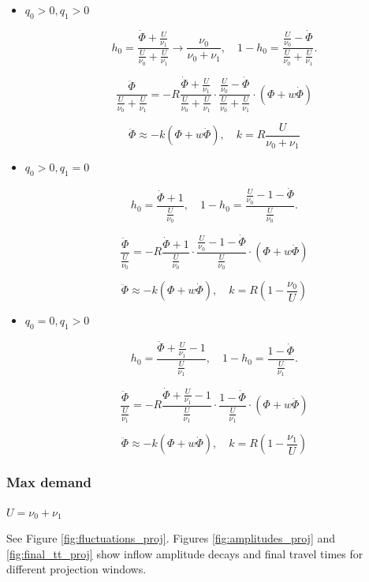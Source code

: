 \documentclass[12pt]{article}
\begin{document}
 \begin{itemize}
 
	\item $ q_0 > 0, q_1 > 0 $
		
	$$ h_0 = \frac{\dot{\Phi} + \frac{U}{\nu_1}}{\frac{U}{\nu_0} + \frac{U}{\nu_1}} \to \frac{\nu_0}{\nu_0 + \nu_1 },\quad 1 - h_0 = \frac{\frac{U}{\nu_0} - \dot{\Phi}}{{\frac{U}{\nu_0} + \frac{U}{\nu_1}}} . $$

$$ \frac{\ddot{\Phi}}{\frac{U}{\nu_0} + \frac{U}{\nu_1}} = -R \frac{\dot{\Phi} + \frac{U}{\nu_1}}{\frac{U}{\nu_0} + \frac{U}{\nu_1}} \cdot \frac{\frac{U}{\nu_0} - \dot{\Phi}}{\frac{U}{\nu_0} + \frac{U}{\nu_1}} \cdot (\Phi + w \dot{\Phi}) $$

$$ \ddot{\Phi} \approx - k (\Phi + w \dot{\Phi}), \quad k = R \frac{U}{\nu_0 + \nu_1} $$

 
	
	\item $ q_0 > 0, q_1 = 0 $ 
	
		$$ h_0 = \frac{\dot{\Phi} + 1}{\frac{U}{\nu_0}} ,\quad 1 - h_0 = \frac{\frac{U}{\nu_0} - 1 - \dot{\Phi}}{{\frac{U}{\nu_0} }} . $$

$$ \frac{\ddot{\Phi}}{\frac{U}{\nu_0} } = -R \frac{\dot{\Phi} + 1}{\frac{U}{\nu_0} } \cdot \frac{\frac{U}{\nu_0} - 1 - \dot{\Phi}}{{\frac{U}{\nu_0} }} \cdot (\Phi + w \dot{\Phi}) $$

$$ \ddot{\Phi} \approx - k (\Phi + w \dot{\Phi}), \quad k = R( 1 -\frac{\nu_0}{U}) $$

	\item $ q_0 = 0, q_1 > 0 $ 
	
		$$ h_0 = \frac{\dot{\Phi} + \frac{U}{\nu_1} - 1}{\frac{U}{\nu_1}} ,\quad 1 - h_0 = \frac{ 1 - \dot{\Phi}}{{\frac{U}{\nu_1} }} . $$

$$ \frac{\ddot{\Phi}}{\frac{U}{\nu_1} } = -R \frac{\dot{\Phi} + \frac{U}{\nu_1} - 1}{\frac{U}{\nu_1}} \cdot \frac{ 1 - \dot{\Phi}}{{\frac{U}{\nu_1} }} \cdot (\Phi + w \dot{\Phi}) $$

$$ \ddot{\Phi} \approx - k (\Phi + w \dot{\Phi}), \quad k = R( 1 -\frac{\nu_1}{U}) $$

 
 \end{itemize}

\subsubsection*{Max demand}

$U = \nu_0 + \nu_1$

See Figure \ref{fig:fluctuations_proj}. Figures \ref{fig:amplitudes_proj} and \ref{fig:final_tt_proj} show inflow amplitude decays and final travel times for different projection windows.
\end{document}
